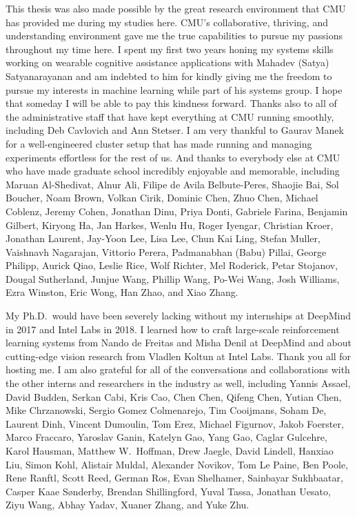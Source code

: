 \documentclass[12pt]{cmuthesis}
\begin{document}
\begin{acknowledgments}
  This thesis was also made possible by the great research
  environment that CMU has provided me during my studies here.
  CMU's collaborative, thriving, and understanding environment gave
  me the true capabilities to pursue my passions throughout my time here.
  I spent my first two years honing my systems skills working on
  wearable cognitive assistance applications with
  Mahadev (Satya) Satyanarayanan and am
  indebted to him for kindly giving me the freedom to pursue my
  interests in machine learning while part of his systems group.
  I hope that someday I will be able to pay this kindness forward.
  Thanks also to all of the administrative staff that have
  kept everything at CMU running smoothly, including
  Deb Cavlovich and Ann Stetser.
  I am very thankful to Gaurav Manek for a well-engineered
  cluster setup that has made running and managing
  experiments effortless for the rest of us.
  And thanks to everybody else at CMU who have made graduate
  school incredibly enjoyable and memorable, including
  Maruan Al-Shedivat,
  Alnur Ali,
  Filipe de Avila Belbute-Peres,
  Shaojie Bai,
  Sol Boucher,
  Noam Brown,
  Volkan Cirik,
  Dominic Chen,
  Zhuo Chen,
  Michael Coblenz,
  Jeremy Cohen,
  Jonathan Dinu,
  Priya Donti,
  Gabriele Farina,
  Benjamin Gilbert,
  Kiryong Ha,
  Jan Harkes,
  Wenlu Hu,
  Roger Iyengar,
  Christian Kroer,
  Jonathan Laurent,
  Jay-Yoon Lee,
  Lisa Lee,
  Chun Kai Ling,
  Stefan Muller,
  Vaishnavh Nagarajan,
  Vittorio Perera,
  Padmanabhan (Babu) Pillai,
  George Philipp,
  Aurick Qiao,
  Leslie Rice,
  Wolf Richter,
  Mel Roderick,
  Petar Stojanov,
  Dougal Sutherland,
  Junjue Wang,
  Phillip Wang,
  Po-Wei Wang,
  Josh Williams,
  Ezra Winston,
  Eric Wong,
  Han Zhao, and
  Xiao Zhang.

  My Ph.D.~would have been severely lacking without my internships
  at DeepMind in 2017 and Intel Labs in 2018.
  I learned how to craft large-scale reinforcement learning systems
  from Nando de Freitas and Misha Denil at DeepMind and
  about cutting-edge vision research from
  Vladlen Koltun at Intel Labs.
  Thank you all for hosting me.
  I am also grateful for all of the conversations and collaborations
  with the other interns and researchers in the industry as well,
  including
  Yannis Assael,
  David Budden,
  Serkan Cabi,
  Kris Cao,
  Chen Chen,
  Qifeng Chen,
  Yutian Chen,
  Mike Chrzanowski,
  Sergio Gomez Colmenarejo,
  Tim Cooijmans,
  Soham De,
  Laurent Dinh,
  Vincent Dumoulin,
  Tom Erez,
  Michael Figurnov,
  Jakob Foerster,
  Marco Fraccaro,
  Yaroslav Ganin,
  Katelyn Gao,
  Yang Gao,
  Caglar Gulcehre,
  Karol Hausman,
  Matthew W.~Hoffman,
  Drew Jaegle,
  David Lindell,
  Hanxiao Liu,
  Simon Kohl,
  Alistair Muldal,
  Alexander Novikov,
  Tom Le Paine,
  Ben Poole,
  Rene Ranftl,
  Scott Reed,
  German Ros,
  Evan Shelhamer,
  Sainbayar Sukhbaatar,
  Casper Kaae Sønderby,
  Brendan Shillingford,
  Yuval Tassa,
  Jonathan Uesato,
  Ziyu Wang,
  Abhay Yadav,
  Xuaner Zhang, and
  Yuke Zhu.


\end{acknowledgments}
\end{document}

